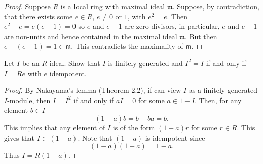 \begin{proof}
Suppose $R$ is a local ring with maximal ideal
$\mathfrak{m}$. Suppose, by contradiction, that there exists some
$e\in R$, $e\neq 0$ or $1$, with $e^2=e$. Then $e^2-e=e(e-1)=0$
so $e$ and $e-1$ are zero-divisors, in particular, $e$ and $e-1$
are non-units and hence contained in the maximal ideal
$\mathfrak{m}$. But then $e-(e-1)=1\in\mathfrak{m}$. This
contradicts the maximality of $\mathfrak{m}$.
\end{proof}
\newpage
\begin{problem}
Let $I$ be an $R$-ideal. Show that $I$ is finitely generated and
$I^2=I$ if and only if $I=Re$ with $e$ idempotent.
\end{problem}
\begin{proof}
By Nakayama's lemma (Theorem 2.2), if can view $I$ as a finitely
generated $I$-module, then $I=I^2$ if and only if $aI=0$ for some
$a\in 1+I$. Then, for any element $b\in I$
\[
(1-a)b=b-ba=b.
\]
This implies that any element of $I$ is of the form $(1-a)r$ for
some $r\in R$. This gives that $I\subset (1-a)$. Note that
$(1-a)$ is idempotent since
\[
(1-a)(1-a)=1-a.
\]
Thus $I=R(1-a)$.
\end{proof}

